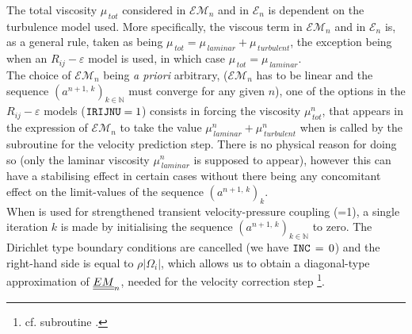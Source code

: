 The total viscosity $\mu_{\,tot}$ considered in $\mathcal{EM}_{n}$ and in
$\mathcal{E}_{n}$ is dependent on the turbulence model used. More specifically, the viscous
term in $\mathcal{EM}_{n}$ and in $\mathcal{E}_{n}$ is, as a general rule, taken as being  $\mu_{\,tot}=\mu_{\,laminar} + \mu_{\,turbulent}$, the exception being when an $R_{ij}-\varepsilon$ model
is used, in which case $\mu_{\,tot}=\mu_{\,laminar}$.\\
The choice of $\mathcal{EM}_{n}$ being  {\it a
priori} arbitrary, ($\mathcal{EM}_{n}$ has to be linear and the sequence
 $(a^{n+1,\,k})_{k\in\mathbb{N}}$ must converge for any given $n$), one of the options in the
$R_{ij}-\varepsilon$ models ($\text{\texttt{IRIJNU}}=1$) consists in forcing the viscosity $\mu_{\,tot}^n$,
that appears in the expression of $\mathcal{EM}_{n}$ to take the value
$\mu_{\,laminar}^n + \mu_{\,turbulent}^n$ when  is called by the subroutine  for the velocity prediction step.  There is no physical reason for doing so (only the laminar viscosity $\mu_{\,laminar}^n$ is supposed to appear), however this can have a stabilising effect in certain cases without there being any concomitant effect on the limit-values of the sequence $(a^{n+1,\,k})_k$.\\

When  is used for strengthened transient velocity-pressure coupling
(=1), a single iteration $k$ is made by initialising the sequence $(a^{n+1,\,k})_{k\in\mathbb{N}}$ to zero. The Dirichlet type boundary conditions are cancelled (we have $\text{\texttt{INC}}\,=\,0$) and the right-hand side is equal to $\rho |\Omega_i|$, which allows us to obtain a diagonal-type approximation of $\underline{\underline{EM}}_{n}$, needed for the velocity correction step \footnote{cf. subroutine .}.

